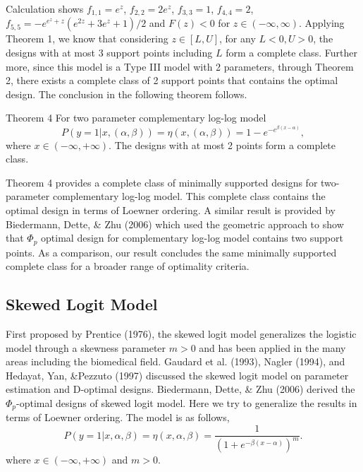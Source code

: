 \documentclass[12pt]{TD-CJS}
\begin{document}
Calculation shows $f_{1,1} = e^z$, $f_{2,2} =2e^z$, $f_{3,3} = 1$, $f_{4,4} = 2$, $f_{5,5} =- e^{e^z+z}(e^{2z}+3e^z+1)/2$ and $F(z)<0$ for $z\in(-\infty,\infty)$. Applying Theorem 1, we know that considering $z\in[L,U]$, for any $L<0, U>0$, the designs with at most 3 support points including $L$ form a complete class. Further more, since this model is a Type III model with 2 parameters, through Theorem 2, there exists a complete class of 2 support points that contains the optimal design. The conclusion in the following theorem follows.




\begin{theorem}{Theorem 4}{}\label{comp}
For two parameter complementary log-log model\[
P(y=1|x,(\alpha,\beta)) = \eta(x,(\alpha,\beta))= 1-e^{-e^{\beta(x-\alpha)}},
\] where $x\in (-\infty,+\infty)$. The designs with at most 2 points form a complete class.
\end{theorem}


Theorem 4 provides a complete class of minimally supported designs for two-parameter complementary log-log model. This complete class contains the optimal design in terms of Loewner ordering. A similar result is provided by Biedermann, Dette, \& Zhu (2006) which used the geometric approach to show that $\Phi_p$ optimal design for complementary log-log model contains two support points. As a comparison, our result concludes the same minimally supported complete class for a broader range of optimality criteria.

\subsection{Skewed Logit Model}\label{secskew}
First proposed by Prentice (1976), the skewed logit model generalizes the logistic model through a skewness parameter $m>0$ and has been applied in the many areas including the biomedical field.  Gaudard et al. (1993), Nagler (1994), and Hedayat, Yan, \&Pezzuto (1997) discussed the skewed logit model on parameter estimation and D-optimal designs. Biedermann, Dette, \& Zhu (2006) derived the $\Phi_p$-optimal designs of skewed logit model. Here we try to generalize the results in terms of Loewner ordering. The model is as follows,\[
P(y=1|x,\alpha,\beta) = \eta(x,\alpha,\beta)= \frac{1}{(1+e^{-\beta(x-\alpha)})^m}.
\]where $x\in (-\infty,+\infty)$ and $m>0$. 
\end{document}

